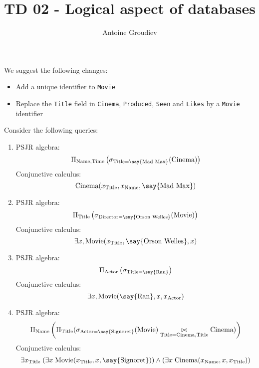 \documentclass{../../cs-classes/cs-classes}
\title{TD 02 - Logical aspect of databases}
\author{Antoine Groudiev}
\newcommand*{\cinema}{\textnormal{Cinema}}
\newcommand*{\titl}{\textnormal{Title}}
\newcommand*{\movie}{\textnormal{Movie}}
\newcommand*{\name}{\textnormal{Name}}
\newcommand*{\tim}{\textnormal{Time}}
\newcommand*{\actor}{\textnormal{Actor}}
\newcommand*{\director}{\textnormal{Director}}
\newcommand{\constant}[1]{\textnormal{\say{#1}}}
\begin{document}
\begin{exercise}
    We suggest the following changes:
    \begin{itemize}
        \item Add a unique identifier to \texttt{Movie}
        \item Replace the \texttt{Title} field in \texttt{Cinema}, \texttt{Produced}, \texttt{Seen} and \texttt{Likes} by a \texttt{Movie} identifier
    \end{itemize}
\end{exercise}

\begin{exercise}
    Consider the following queries:
    \begin{enumerate}
        \item PSJR algebra:
        \begin{equation*}
            \Pi_{\name, \tim}\left(\sigma_{\titl=\constant{Mad Max}}(\cinema)\right)
        \end{equation*}
        Conjunctive calculus:
        \begin{equation*}
            \cinema(x_{\titl}, x_{\name}, \constant{Mad Max})
        \end{equation*}

        \item PSJR algebra:
        \begin{equation*}
            \Pi_{\titl}\left(\sigma_{\director =\constant{Orson Welles}}(\movie)\right)
        \end{equation*}
        Conjunctive calculus:
        \begin{equation*}
            \exists x, \movie(x_{\titl}, \constant{Orson Welles}, x)
        \end{equation*}

        \item PSJR algebra:
        \begin{equation*}
            \Pi_{\actor}\left(\sigma_{\titl=\constant{Ran}}\right)
        \end{equation*}
        Conjunctive calculus:
        \begin{equation*}
            \exists x, \movie(\constant{Ran}, x, x_{\actor})
        \end{equation*}

        \item PSJR algebra:
        \begin{equation*}
            \Pi_{\name}\left(\Pi_{\titl}(\sigma_{\actor=\constant{Signoret}}(\movie)\underset{\titl=\cinema, \titl}{\bowtie}\cinema)\right)
        \end{equation*}
        Conjunctive calculus:
        \begin{equation*}
            \exists x_{\titl} \;(\exists x \;\movie(x_{\titl}, x, \constant{Signoret})) \land (\exists x \; \cinema(x_{\name}, x, x_{\titl}))
        \end{equation*}


\end{enumerate}
\end{exercise}
\end{document}
